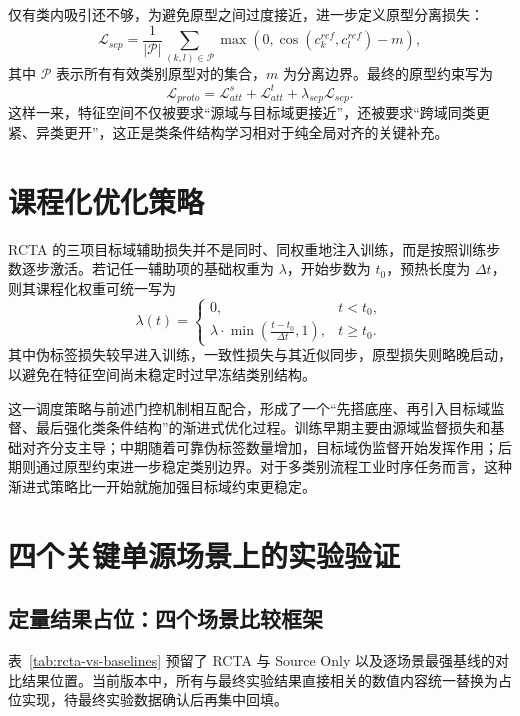 仅有类内吸引还不够，为避免原型之间过度接近，进一步定义原型分离损失：
\begin{equation}
\mathcal{L}_{sep}=
\frac{1}{|\mathcal{P}|}
\sum_{(k,l)\in\mathcal{P}}
\max\left(0,\cos(c_k^{ref},c_l^{ref})-m\right),
\end{equation}
其中 $\mathcal{P}$ 表示所有有效类别原型对的集合，$m$ 为分离边界。最终的原型约束写为
\begin{equation}
\mathcal{L}_{proto}=
\mathcal{L}_{att}^s+\mathcal{L}_{att}^t+\lambda_{sep}\mathcal{L}_{sep}.
\end{equation}
这样一来，特征空间不仅被要求“源域与目标域更接近”，还被要求“跨域同类更紧、异类更开”，这正是类条件结构学习相对于纯全局对齐的关键补充。

\section{课程化优化策略}
RCTA 的三项目标域辅助损失并不是同时、同权重地注入训练，而是按照训练步数逐步激活。若记任一辅助项的基础权重为 $\lambda$，开始步数为 $t_0$，预热长度为 $\Delta t$，则其课程化权重可统一写为
\begin{equation}
\lambda(t)=
\begin{cases}
0, & t<t_0,\\
\lambda \cdot \min\left(\frac{t-t_0}{\Delta t},1\right), & t\ge t_0.
\end{cases}
\end{equation}
其中伪标签损失较早进入训练，一致性损失与其近似同步，原型损失则略晚启动，以避免在特征空间尚未稳定时过早冻结类别结构。

这一调度策略与前述门控机制相互配合，形成了一个“先搭底座、再引入目标域监督、最后强化类条件结构”的渐进式优化过程。训练早期主要由源域监督损失和基础对齐分支主导；中期随着可靠伪标签数量增加，目标域伪监督开始发挥作用；后期则通过原型约束进一步稳定类别边界。对于多类别流程工业时序任务而言，这种渐进式策略比一开始就施加强目标域约束更稳定。

\section{四个关键单源场景上的实验验证}
\subsection{定量结果占位：四个场景比较框架}
表~\ref{tab:rcta-vs-baselines} 预留了 RCTA 与 Source Only 以及逐场景最强基线的对比结果位置。当前版本中，所有与最终实验结果直接相关的数值内容统一替换为占位实现，待最终实验数据确认后再集中回填。

